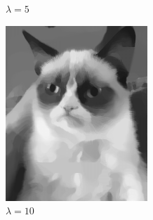 \documentclass{paper}
\begin{document}
\begin{figure}[ht]
\begin{subfigure}[ht]{0.3\textwidth}
	\caption*{$\lambda = 5$}
\end{subfigure}

\vspace{3mm}
\begin{subfigure}[ht]{0.3\textwidth}
	\centering
	\includegraphics[width=\textwidth]{result-cat-lambda10-theta0_5-iter1500}
	\caption*{$\lambda = 10$}
\end{subfigure}
~
\begin{subfigure}[ht]{0.3\textwidth}
	\centering

\end{subfigure}
\end{figure}
\end{document}
